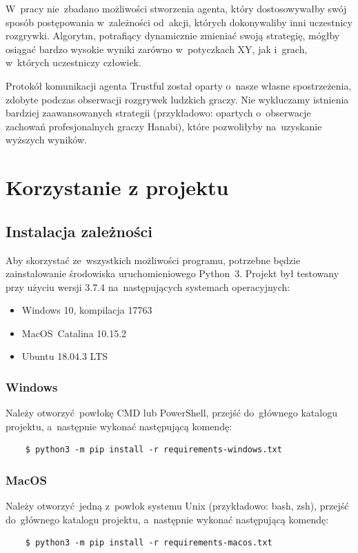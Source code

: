 \documentclass[declaration,shortabstract,inz]{iithesis}
\begin{document}
W~pracy nie~zbadano możliwości stworzenia agenta, który dostosowywałby swój sposób postępowania w~zależności od~akcji, których dokonywaliby inni uczestnicy rozgrywki. Algorytm, potrafiący dynamicznie zmieniać swoją strategię, mógłby osiągać bardzo wysokie wyniki zarówno w~potyczkach XY, jak i~grach, w~których uczestniczy człowiek.

Protokół komunikacji agenta Trustful został oparty o~nasze własne spostrzeżenia, zdobyte podczas obserwacji rozgrywek ludzkich graczy. Nie wykluczamy istnienia bardziej zaawansowanych strategii (przykładowo: opartych o~obserwacje zachowań profesjonalnych graczy Hanabi), które pozwoliłyby na~uzyskanie wyższych wyników.

\appendix
\chapter{Korzystanie z projektu}

\section{Instalacja zależności}
Aby skorzystać ze~wszystkich możliwości programu, potrzebne będzie zainstalowanie środowiska uruchomieniowego Python~3. Projekt był testowany przy użyciu wersji 3.7.4 na~następujących systemach operacyjnych:
\begin{itemize}
	\item Windows 10, kompilacja 17763
	\item MacOS~Catalina 10.15.2
	\item Ubuntu 18.04.3 LTS
\end{itemize}

\subsection{Windows}

Należy otworzyć powłokę CMD lub PowerShell, przejść do~głównego katalogu projektu, a~następnie wykonać następującą komendę:
\begin{verbatim}
    $ python3 -m pip install -r requirements-windows.txt
\end{verbatim}

\subsection{MacOS}

Należy otworzyć jedną z~powłok systemu Unix (przykładowo: bash, zsh), przejść do~głównego katalogu projektu, a~następnie wykonać następującą komendę:
\begin{verbatim}
    $ python3 -m pip install -r requirements-macos.txt
\end{verbatim}
\end{document}
